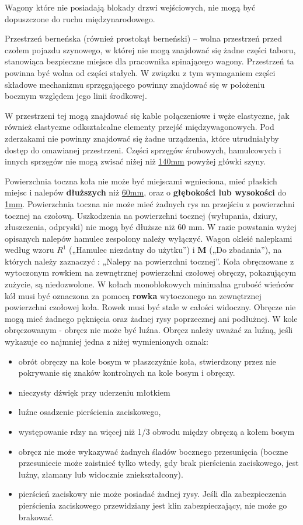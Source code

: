 Wagony które nie posiadają blokady drzwi wejściowych, nie mogą być dopuszczone do ruchu międzynarodowego.

Przestrzeń berneńska (również prostokąt berneński) – wolna przestrzeń przed czołem pojazdu szynowego, w której nie mogą znajdować się żadne części taboru, stanowiąca bezpieczne miejsce dla pracownika spinającego wagony. Przestrzeń ta powinna być wolna od części stałych. W związku z tym wymaganiem części składowe mechanizmu sprzęgającego powinny znajdować się w położeniu bocznym względem jego linii środkowej.

W przestrzeni tej mogą znajdować się kable połączeniowe i węże elastyczne, jak również elastyczne odkształcalne elementy przejść międzywagonowych. Pod zderzakami nie powinny znajdować się żadne urządzenia, które utrudniałyby dostęp do omawianej przestrzeni. 
Części sprzęgów śrubowych, hamulcowych i innych sprzęgów nie mogą zwisać niżej niż \underline{140mm} powyżej główki szyny.

Powierzchnia toczna koła nie może być miejscami wgnieciona, mieć płaskich miejsc i nalepów \textbf{dłuższych} niż \underline{60mm}, oraz o \textbf{głębokości lub wysokości} do \underline{1mm}. Powierzchnia toczna nie może mieć żadnych rys na przejściu z powierzchni tocznej na czołową. Uszkodzenia na powierzchni tocznej (wyłupania, dziury, złuszczenia, odpryski) nie mogą być dłuższe niż 60 mm. W razie powstania wyżej opisanych nalepów hamulec zespolony należy wyłączyć. Wagon okleić nalepkami według wzoru $R^{1}$ („Hamulec niezdatny do użytku”) i \textbf{M} („Do zbadania”), na których należy zaznaczyć : „Nalepy na powierzchni tocznej”.
Koła obręczowane z wytoczonym rowkiem na zewnętrznej powierzchni czołowej obręczy, pokazującym zużycie, są niedozwolone.
W kołach monoblokowych minimalna grubość wieńców kół musi być oznaczona za pomocą \textbf{rowka} wytoczonego na zewnętrznej powierzchni czołowej koła. Rowek musi być stale w całości widoczny.
Obręcze nie mogą mieć żadnego pęknięcia oraz żadnej rysy poprzecznej ani podłużnej. W kole obręczowanym - obręcz nie może być luźna.
Obręcz należy uważać za luźną, jeśli wykazuje co najmniej jedna z niżej wymienionych oznak:

\begin{itemize}
	\item obrót obręczy na kole bosym w płaszczyźnie koła, stwierdzony przez nie pokrywanie się znaków kontrolnych na kole bosym i obręczy.
	\item nieczysty dźwięk przy uderzeniu młotkiem
	\item luźne osadzenie pierścienia zaciskowego,
	\item występowanie rdzy na więcej niż 1/3 obwodu między obręczą a kołem bosym
	\item obręcz nie może wykazywać żadnych śladów bocznego przesunięcia (boczne przesuniecie może zaistnieć tylko wtedy, gdy brak pierścienia zaciskowego, jest luźny, złamany lub widocznie zniekształcony).
	\item pierścień zaciskowy nie może posiadać żadnej rysy. Jeśli dla zabezpieczenia pierścienia zaciskowego przewidziany jest klin zabezpieczający, nie może go brakować.
\end{itemize}

